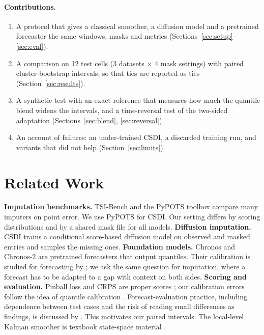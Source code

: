 \documentclass[10pt,twocolumn]{article}
\begin{document}
\paragraph{Contributions.}
\begin{enumerate}
\item A protocol that gives a classical smoother, a diffusion model and a pretrained forecaster the same windows, masks and metrics (Sections~\ref{sec:setup}--\ref{sec:eval}).
\item A comparison on 12 test cells (3 datasets $\times$ 4 mask settings) with paired cluster-bootstrap intervals, so that ties are reported as ties (Section~\ref{sec:results}).
\item A synthetic test with an exact reference that measures how much the quantile blend widens the intervals, and a time-reversal test of the two-sided adaptation (Sections~\ref{sec:blend}, \ref{sec:reversal}).
\item An account of failures: an under-trained CSDI, a discarded training run, and variants that did not help (Section~\ref{sec:limits}).
\end{enumerate}

\section{Related Work}
\textbf{Imputation benchmarks.} TSI-Bench \citep{du2024tsibench} and the PyPOTS toolbox \citep{du2023pypots} compare many imputers on point error. We use PyPOTS for CSDI. Our setting differs by scoring distributions and by a shared mask file for all models. \textbf{Diffusion imputation.} CSDI \citep{tashiro2021csdi} trains a conditional score-based diffusion model on observed and masked entries and samples the missing ones. \textbf{Foundation models.} Chronos \citep{ansari2024chronos} and Chronos-2 \citep{ansari2025chronos2} are pretrained forecasters that output quantiles. Their calibration is studied for forecasting by \citet{adler2026beyond}; we ask the same question for imputation, where a forecast has to be adapted to a gap with context on both sides. \textbf{Scoring and evaluation.} Pinball loss and CRPS are proper scores \citep{koenker1978,gneiting2007}; our calibration errors follow the idea of quantile calibration \citep{kuleshov2018}. Forecast-evaluation practice, including dependence between test cases and the risk of reading small differences as findings, is discussed by \citet{bergmeir2023}. This motivates our paired intervals. The local-level Kalman smoother is textbook state-space material \citep{kalman1960,durbin2012}.
\end{document}
